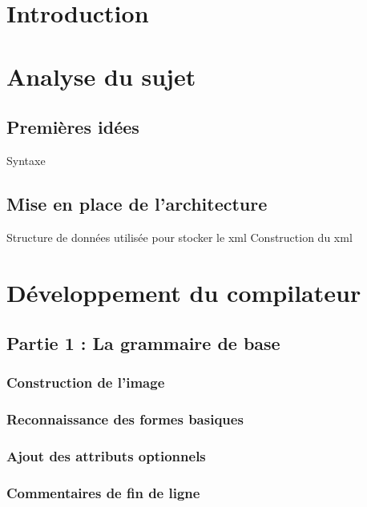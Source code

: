 
\chapter*{Introduction}

\chapter{Analyse du sujet}

	\section{Premières idées}
	Syntaxe
	
	\section{Mise en place de l'architecture}
	Structure de données utilisée pour stocker le xml 
	Construction du xml
	
	
	
\chapter{Développement du compilateur}
	
	\section{Partie 1 : La grammaire de base}

		\subsection{Construction de l'image}

		\subsection{Reconnaissance des formes basiques}

		\subsection{Ajout des attributs optionnels}
	
		\subsection{Commentaires de fin de ligne}
	

